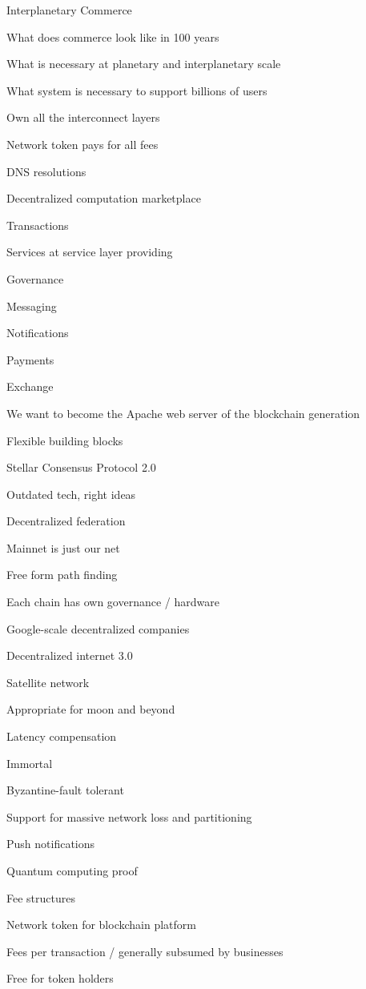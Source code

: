 \documentclass[11pt]{article}
\begin{document}
Interplanetary Commerce


What does commerce look like in 100 years


What is necessary at planetary and interplanetary scale


What system is necessary to support billions of users


Own all the interconnect layers


Network token pays for all fees


DNS resolutions


Decentralized computation marketplace


Transactions


Services at service layer providing


Governance


Messaging


Notifications


Payments


Exchange


We want to become the Apache web server of the blockchain generation


Flexible building blocks


Stellar Consensus Protocol 2.0


Outdated tech, right ideas


Decentralized federation


Mainnet is just our net


Free form path finding


Each chain has own governance / hardware


Google-scale decentralized companies


Decentralized internet 3.0


Satellite network


Appropriate for moon and beyond


Latency compensation


Immortal


Byzantine-fault tolerant


Support for massive network loss and partitioning


Push notifications


Quantum computing proof


Fee structures


Network token for blockchain platform


Fees per transaction / generally subsumed by businesses


Free for token holders
\end{document}
